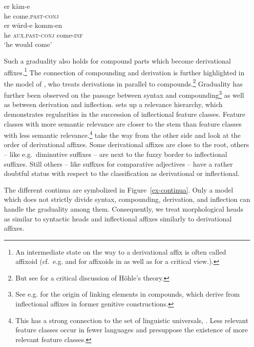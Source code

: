 \documentclass[output=paper
  ,nobabel
  ,draftmode
  ,colorlinks, citecolor=brown
]{langscibook}
\begin{document}
\eal\label{conj}
\ex
\gll er    käm-e \\ he   come.\textsc{past-conj}  \\
\glt 
\ex
\gll er    würd-e   komm-en\\ he   \textsc{aux.past-conj} come-\textsc{inf}  \\
\glt `he would come'
\zl

\noindent Such a graduality also holds for compound parts which become derivational affixes.\footnote{An intermediate state on the way to a derivational affix is often called affixoid (cf.\ e.g. \cite{Elsen2009} and \cite{Szatmari2011} for affixoids in  as well as \cite{Schmidt1987} for a critical view.).} The connection of compounding and derivation is further highlighted in the model of \citet{Hoehle1982}, who treats derivations in parallel to compounds.\footnote{But see \citet{Reis1983} for a critical discussion of Höhle's theory.} Graduality has further been observed on the passage between syntax and compounding\footnote{See e.g. \citet[Section~2]{NueblingSzczepaniak2009} for the origin of linking elements in  compounds, which derive from inflectional affixes in former genitive constructions.} as well as between derivation and inflection. \citet{Bybee1985} sets up a relevance hierarchy, which demonstrates regularities in the succession of inflectional feature classes. Feature classes with more semantic relevance are closer to the stem than feature classes with less semantic relevance.\footnote{This has a strong connection to the set of linguistic universals, \citep[cf.][]{Greenberg1963}. Less relevant feature classes occur in fewer languages and presuppose the existence of more relevant feature classes.} \citet{EisenbergSayatz2002} take the way from the other side and look at the order of derivational affixes. Some derivational affixes are close to the root, others – like e.g.\ diminutive suffixes \citep[cf.][]{Dressler1994} – are next to the fuzzy border to inflectional suffixes. Still others – like suffixes for comparative adjectives – have a rather doubtful status with respect to the classification as derivational or inflectional.

The different continua are symbolized in Figure~\ref{ex-continua}. Only a model which does not strictly divide syntax, compounding, derivation, and inflection can handle the graduality among them. Consequently, we treat morphological heads as similar to syntactic heads and inflectional affixes similarly to derivational affixes.
\end{document}
